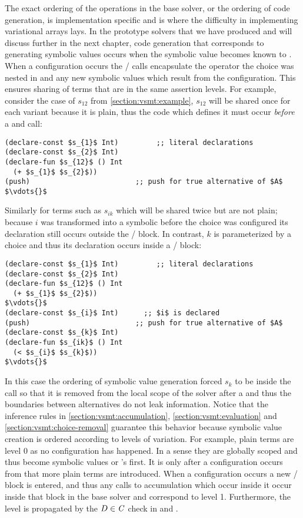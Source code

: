 The exact ordering of the operations in the base solver, or the ordering of code
generation, is implementation specific and is where the difficulty in
implementing variational arrays lays. In the prototype solvers that we have
produced and will discuss further in the next chapter, code generation that
corresponds to generating symbolic values occurs when the symbolic value becomes
known to \aStore. When a configuration occurs the / calls
encapsulate the operator the choice was nested in and any new symbolic values
which result from the configuration. This ensures sharing of terms that are in
the same assertion levels. For example, consider the case of $s_{12}$ from
\autoref{section:vsmt:example}, $s_{12}$ will be shared once for each variant
because it is plain, thus the code which defines it must occur \emph{before} a
 and  call:
%
\begin{lstlisting}[columns=flexible,keepspaces=true,language=SMTLIB]
(declare-const $s_{1}$ Int)         ;; literal declarations
(declare-const $s_{2}$ Int)
(declare-fun $s_{12}$ () Int
  (+ $s_{1}$ $s_{2}$))
(push)                         ;; push for true alternative of $A$
$\vdots{}$
\end{lstlisting}
%
Similarly for terms such as $s_{ik}$ which will be shared twice but are not
plain; because $i$ was transformed into a symbolic before the choice was
configured its declaration still occurs outside the / block. In
contrast, $k$ is parameterized by a choice and thus its declaration occurs
inside a / block:
% 
\begin{lstlisting}[columns=flexible,keepspaces=true,language=SMTLIB,breaklines=true]
(declare-const $s_{1}$ Int)         ;; literal declarations
(declare-const $s_{2}$ Int)
(declare-fun $s_{12}$ () Int
  (+ $s_{1}$ $s_{2}$))
$\vdots{}$
(declare-const $s_{i}$ Int)      ;; $i$ is declared
(push)                         ;; push for true alternative of $A$
(declare-const $s_{k}$ Int)
(declare-fun $s_{ik}$ () Int
  (< $s_{i}$ $s_{k}$))
$\vdots{}$
\end{lstlisting}
% 
In this case the ordering of symbolic value generation forced $s_{k}$ to be
inside the  call so that it is removed from the local scope of the
solver after a  and thus the boundaries between alternatives do not leak
information. Notice that the inference rules in
\autoref{section:vsmt:accumulation}, \autoref{section:vsmt:evaluation} and
\autoref{section:vsmt:choice-removal} guarantee this behavior because symbolic
value creation is ordered according to levels of variation. For example, plain
terms are level 0 as no configuration has happened. In a sense they are globally
scoped and thus become symbolic values or \unit{}'s first. It is only after a
configuration occurs from \crChc{} that more plain terms are introduced. When a
configuration occurs a new / block is entered, and thus any
calls to accumulation which occur inside it occur inside that block in the base
solver and correspond to level 1. Furthermore, the level is propagated by the $D
\in \mathit{C}$ check in \crChcT{} and \crChcF{}.

